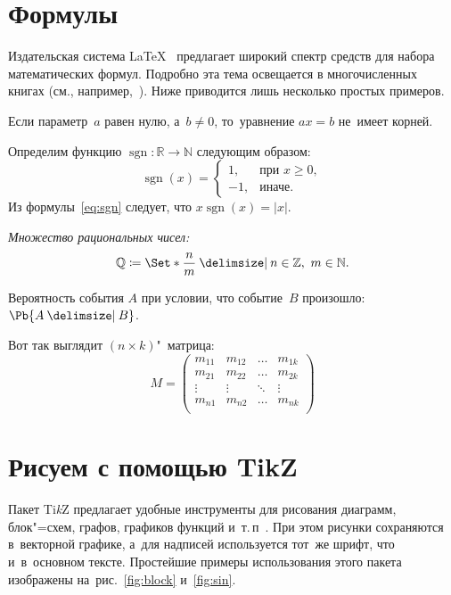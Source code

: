 \documentclass[a4paper,14pt]{diplom}
\newcommand{\N}{\mathbb{N}}
\newcommand{\Z}{\mathbb{Z}}
\newcommand{\R}{\mathbb{R}}
\DeclareMathOperator{\sgn}{sgn}
\newcommand{\from}{\colon}
\renewcommand{\ge}{\geqslant}
\begin{document}
\chapter{Формулы}
Издательская система \LaTeX~\cite{tex_yarsu} предлагает широкий спектр средств для набора математических формул.
Подробно эта тема освещается в многочисленных книгах (см., например,~\cite{oetiker_lshort, kotelnikov2004}).
Ниже приводится лишь несколько простых примеров.

Если параметр~$a$ равен нулю, а~$b \ne 0$, то~уравнение \(a x = b\) не~имеет корней.

Определим функцию $\sgn \from \R \to \N$ следующим образом:
\begin{equation}
\sgn(x) = \begin{cases}
    1, & \text{при } x \ge 0,\\
   -1, & \text{иначе.}
\end{cases}
\label{eq:sgn}
\end{equation}
Из формулы~\eqref{eq:sgn} следует, что $x \sgn(x) = |x|$.

\emph{Множество рациональных чисел:}
\[
  \mathbb{Q} \coloneqq \Set*{ \frac{n}{m} \given n\in\Z, \ m\in\N}.
\]

Вероятность события $A$ при условии, что событие~$B$ произошло:
$\Pb{A \given B}$.

Вот так выглядит $(n\times k)$"~матрица:
\begin{equation}
M = \begin{pmatrix}
  m_{11} & m_{12} & \dots & m_{1k} \\
  m_{21} & m_{22} & \dots & m_{2k} \\
  \vdots & \vdots & \ddots & \vdots \\
  m_{n1} & m_{n2} & \dots & m_{nk} \\
  \end{pmatrix}
  \label{eq:matrix}
\end{equation}

\chapter{Рисуем с помощью TikZ}
Пакет Ti\textit{k}Z предлагает удобные инструменты для рисования диаграмм, блок"=схем, графов, графиков функций и~т.\,п~\cite{tikz, kirutenko2014}.
При этом рисунки сохраняются в~векторной графике, а~для  надписей используется тот~же шрифт, что и~в~основном тексте.
Простейшие примеры использования этого пакета изображены на~рис.~\ref{fig:block} и~\ref{fig:sin}.
\end{document}
